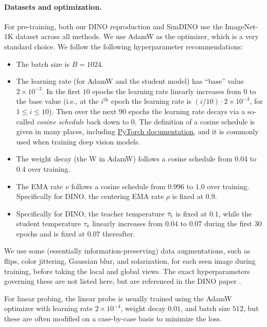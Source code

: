 \documentclass[../../book-main.tex]{subfiles}
\begin{document}
\paragraph{Datasets and optimization.} For pre-training, both our DINO reproduction and SimDINO use the ImageNet-1K dataset across all methods. We use AdamW \citep{Loshchilov2017DecoupledWD} as the optimizer, which is a very standard choice. We follow the following hyperparameter recommendations:
\begin{itemize}
    \item The batch size is \(B = 1024\).
    \item The learning rate (for AdamW and the student model) has ``base'' value \(2 \times 10^{-3}\). In the first \(10\) epochs the learning rate linearly increases from \(0\) to the base value (i.e., at the \(i^{\mathrm{th}}\) epoch the learning rate is \((i/10) \cdot 2 \times 10^{-3}\), for \(1 \leq i \leq 10\)). Then over the next \(90\) epochs the learning rate decays via a so-called \textit{cosine schedule} back down to \(0\). The definition of a cosine schedule is given in many places, including \href{https://pytorch.org/docs/stable/generated/torch.optim.lr_scheduler.CosineAnnealingLR.html}{PyTorch documentation}, and it is commonly used when training deep vision models.
    \item The weight decay (the W in AdamW) follows a cosine schedule from 0.04 to \(0.4\) over training.
    \item The EMA rate \(\nu\) follows a cosine schedule from \(0.996\) to \(1.0\) over training. Specifically for DINO, the centering EMA rate \(\rho\) is fixed at \(0.9\).
    \item Specifically for DINO, the teacher temperature \(\tau_{\mathrm{t}}\) is fixed at \(0.1\), while the student temperature \(\tau_{\mathrm{s}}\) linearly increases from \(0.04\) to \(0.07\) during the first \(30\) epochs and is fixed at \(0.07\) thereafter.
\end{itemize}
We use some (essentially information-preserving) data augmentations, such as flips, color jittering, Gaussian blur, and solarization, for each seen image during training, before taking the local and global views. The exact hyperparameters governing these are not listed here, but are referenced in the DINO paper \citep{caron2021emerging}.

For linear probing, the linear probe is usually trained using the AdamW optimizer with learning rate \(2 \times 10^{-4}\), weight decay \(0.01\), and batch size \(512\), but these are often modified on a case-by-case basis to minimize the loss.
\end{document}
